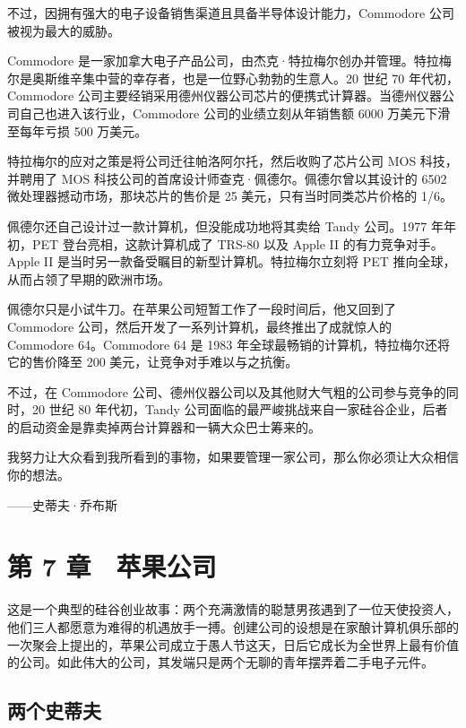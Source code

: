 \documentclass[12pt,UTF8]{ctexbook}
\begin{document}
不过，因拥有强大的电子设备销售渠道且具备半导体设计能力，Commodore 公司被视为最大的威胁。

Commodore 是一家加拿大电子产品公司，由杰克·特拉梅尔创办并管理。特拉梅尔是奥斯维辛集中营的幸存者，也是一位野心勃勃的生意人。20 世纪 70 年代初，Commodore 公司主要经销采用德州仪器公司芯片的便携式计算器。当德州仪器公司自己也进入该行业，Commodore 公司的业绩立刻从年销售额 6000 万美元下滑至每年亏损 500 万美元。

特拉梅尔的应对之策是将公司迁往帕洛阿尔托，然后收购了芯片公司 MOS 科技，并聘用了 MOS 科技公司的首席设计师查克·佩德尔。佩德尔曾以其设计的 6502 微处理器撼动市场，那块芯片的售价是 25 美元，只有当时同类芯片价格的 1/6。

佩德尔还自己设计过一款计算机，但没能成功地将其卖给 Tandy 公司。1977 年年初，PET 登台亮相，这款计算机成了 TRS-80 以及 Apple II 的有力竞争对手。Apple II 是当时另一款备受瞩目的新型计算机。特拉梅尔立刻将 PET 推向全球，从而占领了早期的欧洲市场。

佩德尔只是小试牛刀。在苹果公司短暂工作了一段时间后，他又回到了 Commodore 公司，然后开发了一系列计算机，最终推出了成就惊人的 Commodore 64。Commodore 64 是 1983 年全球最畅销的计算机，特拉梅尔还将它的售价降至 200 美元，让竞争对手难以与之抗衡。

不过，在 Commodore 公司、德州仪器公司以及其他财大气粗的公司参与竞争的同时，20 世纪 80 年代初，Tandy 公司面临的最严峻挑战来自一家硅谷企业，后者的启动资金是靠卖掉两台计算器和一辆大众巴士筹来的。





我努力让大众看到我所看到的事物，如果要管理一家公司，那么你必须让大众相信你的想法。

——史蒂夫·乔布斯





\chapter{第 7 章　苹果公司}


这是一个典型的硅谷创业故事：两个充满激情的聪慧男孩遇到了一位天使投资人，他们三人都愿意为难得的机遇放手一搏。创建公司的设想是在家酿计算机俱乐部的一次聚会上提出的，苹果公司成立于愚人节这天，日后它成长为全世界上最有价值的公司。如此伟大的公司，其发端只是两个无聊的青年摆弄着二手电子元件。





\section{两个史蒂夫}
\end{document}
